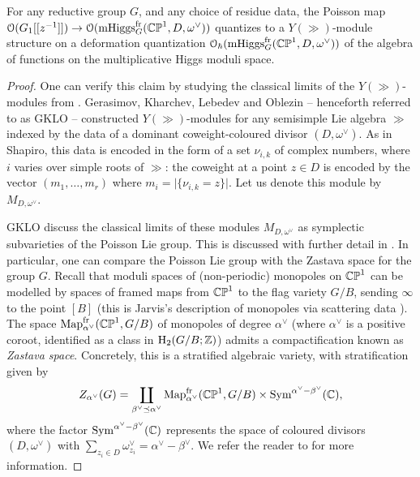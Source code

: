 \documentclass[10pt, oneside]{article}
\DeclareMathOperator{\mhiggs}{mHiggs}
\newcommand{\fr}{\mathrm{fr}}
\begin{document}
\begin{theorem}
For any reductive group $G$, and any choice of residue data, the Poisson map $\OO(G_1[[z^{-1}]]) \to \OO(\mhiggs^\fr_G(\bb{CP}^1,D,\omega^\vee))$ quantizes to a $Y(\gg)$-module structure on a deformation quantization $\OO_\hbar(\mhiggs^\fr_G(\bb{CP}^1,D,\omega^\vee))$ of the algebra of functions on the multiplicative Higgs moduli space.  
\end{theorem}

\begin{proof}
One can verify this claim by studying the classical limits of the $Y(\gg)$-modules from \cite{GKLO}.  Gerasimov, Kharchev, Lebedev and Oblezin -- henceforth referred to as GKLO -- constructed $Y(\gg)$-modules for any semisimple Lie algebra $\gg$ indexed by the data of a dominant coweight-coloured divisor $(D, \omega^\vee)$.  As in Shapiro, this data is encoded in the form of a set $\nu_{i,k}$ of complex numbers, where $i$ varies over simple roots of $\gg$: the coweight at a point $z \in D$ is encoded by the vector $(m_1, \ldots, m_r)$ where $m_i = \lvert\{\nu_{i,k} = z\}\rvert$.  Let us denote this module by $M_{D,\omega^\vee}$.

GKLO discuss the classical limits of these modules $M_{D,\omega^\vee}$ as symplectic subvarieties of the Poisson Lie group.  This is discussed with further detail in \cite[Section 4]{Shapiro}.  In particular, one can compare the Poisson Lie group with the Zastava space for the group $G$.  Recall that  moduli spaces of (non-periodic) monopoles on $\mathbb{CP}^1$ can be modelled by spaces of framed maps from $\mathbb{CP}^1$ to the flag variety $G/B$, sending $\infty$ to the point $[B]$ (this is Jarvis's description of monopoles via scattering data \cite{Jarvis}).  The space $\mr{Map}_{\alpha^\vee}^\fr(\bb{CP}^1, G/B)$ of monopoles of degree $\alpha^\vee$ (where $\alpha^\vee$ is a positive coroot, identified as a class in $\mathrm{H}_2(G/B;\mathbb{Z})$) admits a compactification known as \emph{Zastava space}.  Concretely, this is a stratified algebraic variety, with stratification given by
\[Z_{\alpha^\vee}(G) = \coprod_{\beta^\vee \preceq \alpha^\vee} \mr{Map}_{\alpha^\vee}^\fr(\bb{CP}^1, G/B) \times \sym^{\alpha^\vee - \beta^\vee}(\CC),\]
where the factor $\operatorname{Sym}^{\alpha^\vee - \beta^\vee}(\mathbb{C})$ represents the space of coloured divisors $(D, \omega^\vee)$ with $\sum_{z_i \in D} \omega^\vee_{z_i} = \alpha^\vee - \beta^\vee$.  We refer the reader to  for more information.


\end{proof}
\end{document}
